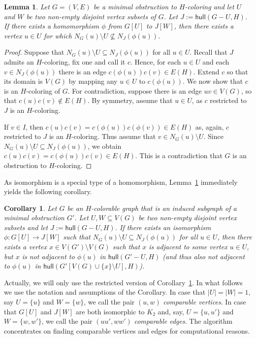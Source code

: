 \documentclass[11pt,a4paper]{article}
\theoremstyle{mystyle}
\newtheorem{lemma}[theorem]{Lemma}
\newtheorem{corollary}[theorem]{Corollary}
\newcommand{\hull}{\mathsf{hull}}
\begin{document}
\begin{lemma}
\label{similarGraphsLemma}
Let $G=(V,E)$ be a minimal obstruction to $H$-coloring and let $U$ and $W$ be two non-empty disjoint vertex subsets of $G$.
Let $J := \hull(G-U,H)$.
If there exists a homomorphism $\phi$ from $G[U]$ to $J[W]$, then there exists a vertex $u \in U$ for which $N_G(u) \setminus U \nsubseteq N_J(\phi(u))$.
\end{lemma}
\begin{proof}
Suppose that $N_G(u)\setminus U \subseteq N_J(\phi(u))$ for all $u \in U$.
Recall that $J$ admits an $H$-coloring, fix one and call it $c$.
Hence, for each $u \in U$ and each $v \in N_J(\phi(u))$ there is an edge $c(\phi(u))c(v) \in E(H)$.
Extend $c$ so that its domain is $V(G)$ by mapping any $u \in U$ to $c(\phi(u))$.
We now show that $c$ is an $H$-coloring of $G$. For contradiction, suppose there is an edge $uv \in V(G)$,
so that $c(u)c(v) \notin E(H)$. By symmetry, assume that $u \in U$, as $c$ restricted to $J$ is an $H$-coloring.

If $v \in I$, then $c(u)c(v) = c(\phi(u))c(\phi(v)) \in E(H)$ as, again, $c$ restricted to $J$ is an $H$-coloring.
Thus assume that $v \in N_G(u)\setminus U$.
Since $N_G(u)\setminus U \subseteq N_J(\phi(u))$, we obtain $c(u)c(v) = c(\phi(u))c(v) \in E(H)$.
This is a contradiction that $G$ is an obstruction to $H$-coloring.
\end{proof}

As isomorphism is a special type of a homomorphism, Lemma~\ref{similarGraphsLemma} immediately yields the following corollary.

\begin{corollary}\label{cor:comparableGraphs}
Let $G$ be an $H$-colorable graph that is an induced subgraph of a minimal obstruction $G'$.
Let $U, W \subseteq V(G)$ be two non-empty disjoint vertex subsets and let $J := \hull(G-U,H)$.
If there exists an isomorphism  $\phi : G[U] \rightarrow J[W]$ such that $N_G(u) \setminus U \subseteq N_J(\phi(u))$ for all $u \in U$, then there exists a vertex $x \in V(G') \setminus V(G)$ such that $x$ is adjacent to some vertex $u \in U$, but $x$ is not adjacent to $\phi(u)$ in $\hull(G'-U,H)$ (and thus also not adjacent to $\phi(u)$ in $\hull(G'[V(G) \cup \{x\} \setminus U],H)$).
\end{corollary}

Actually, we will only use the restricted version of Corollary~\ref{cor:comparableGraphs}. In what follows we use the notation and assumptions of the Corollary.
In case that $|U|=|W|=1$, say $U = \{u\}$ and $W = \{w\}$, we call the pair $(u,w)$ \textit{comparable vertices}.
In case that $G[U]$ and $J[W]$ are both isomorphic to $K_2$ and, say, $U = \{u,u'\}$ and $W = \{w,w'\}$,
we call the pair $(uu',ww')$ \textit{comparable edges}.
The algorithm concentrates on finding comparable vertices and edges for computational reasons.
\end{document}
